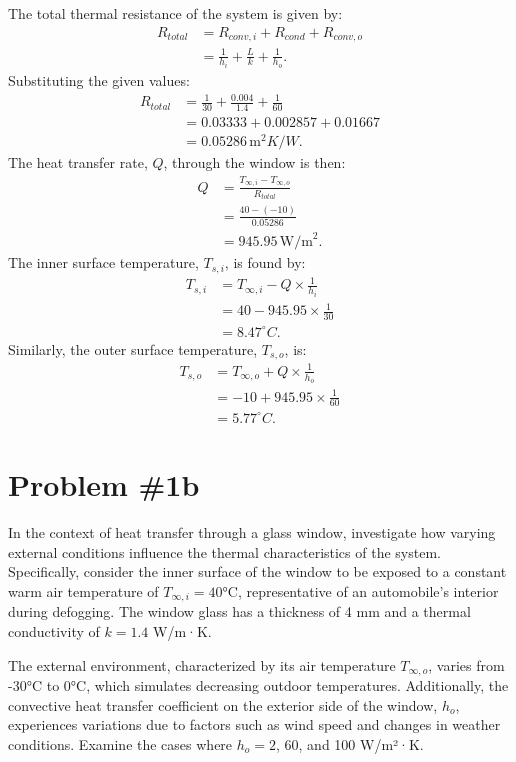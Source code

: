 \documentclass{article}
\begin{document}
\noindent
The total thermal resistance of the system is given by:
\begin{align*}
R_{total} &= R_{conv,i} + R_{cond} + R_{conv,o} \\
&= \frac{1}{h_i} + \frac{L}{k} + \frac{1}{h_o}.
\end{align*}
Substituting the given values:
\begin{align*}
R_{total} &= \frac{1}{30} + \frac{0.004}{1.4} + \frac{1}{60} \\
&= 0.03333 + 0.002857 + 0.01667 \\
&= 0.05286 \, \text{m}^2K/W.
\end{align*}
\noindent
The heat transfer rate, $Q$, through the window is then:
\begin{align*}
Q &= \frac{T_{\infty,i} - T_{\infty,o}}{R_{total}} \\
&= \frac{40 - (-10)}{0.05286} \\
&= 945.95 \, \text{W/m}^2.
\end{align*}
\noindent
The inner surface temperature, $T_{s,i}$, is found by:
\begin{align*}
T_{s,i} &= T_{\infty,i} - Q \times \frac{1}{h_i} \\
&= 40 - 945.95 \times \frac{1}{30} \\
&= 8.47^\circ C.
\end{align*}
\noindent
Similarly, the outer surface temperature, $T_{s,o}$, is:
\begin{align*}
T_{s,o} &= T_{\infty,o} + Q \times \frac{1}{h_o} \\
&= -10 + 945.95 \times \frac{1}{60} \\
&= 5.77^\circ C.
\end{align*}
\newline
\section*{Problem \#1b}

In the context of heat transfer through a glass window, investigate how varying external conditions influence the thermal characteristics of the system. Specifically, consider the inner surface of the window to be exposed to a constant warm air temperature of \(T_{\infty,i} = 40\)°C, representative of an automobile's interior during defogging. The window glass has a thickness of 4 mm and a thermal conductivity of \(k = 1.4\) W/m·K.

The external environment, characterized by its air temperature \(T_{\infty,o}\), varies from -30°C to 0°C, which simulates decreasing outdoor temperatures. Additionally, the convective heat transfer coefficient on the exterior side of the window, \(h_o\), experiences variations due to factors such as wind speed and changes in weather conditions. Examine the cases where \(h_o = 2\), 60, and 100 W/m²·K.
\end{document}
